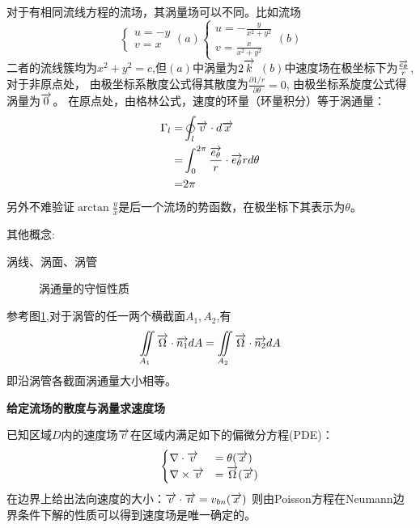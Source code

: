 对于有相同流线方程的流场，其涡量场可以不同。比如流场
\begin{equation}\label{eq:31example}
\begin{cases}u=-y\\v=x\end{cases}(a) \begin{cases}u=-\frac{y}{x^2+y^2}\\v=\frac{x}{x^2+y^2}\end{cases}(b)
\end{equation}
二者的流线簇均为$x^2+y^2=c$,但$(a)$中涡量为$2\overrightarrow{k}$
$(b)$中速度场在极坐标下为$\frac{\overrightarrow{e_{\theta}}}{r}$,对于非原点处，
由极坐标系散度公式\cite{CylindricalCoordinates}得其散度为$\frac{\partial 1/r}{\partial \theta}=0$,
由极坐标系旋度公式\cite{CurlFormular}得涡量为$\overrightarrow{0}$。
在原点处，由格林公式，速度的环量（环量积分）等于涡通量：
\begin{align}
\Gamma_l =& \oint_l \overrightarrow{v}\cdot d\overrightarrow{x}\\
=& \int_{0}^{2\pi} \frac{\overrightarrow{e_{\theta}}}{r}\cdot  \overrightarrow{e_{\theta}} rd\theta \\
=& 2\pi
\end{align}
另外不难验证$\arctan\frac{y}{x}$是后一个流场的势函数，在极坐标下其表示为$\theta$。

其他概念:

涡线、涡面、涡管

\begin{figure}[!ht]
\def\svgwidth{5cm}
\centering

\caption{涡通量的守恒性质}\label{fig:312}
\end{figure}



参考图\ref{fig:312},对于涡管的任一两个横截面$A_1,A_2$,有
\begin{equation}
\iint\limits_{A_1} \overrightarrow{\Omega}\cdot \overrightarrow{n_1} dA=\iint\limits_{A_2} \overrightarrow{\Omega}\cdot \overrightarrow{n_2} dA
\end{equation}
即沿涡管各截面涡通量大小相等。

\textbf{给定流场的散度与涡量求速度场}

已知区域$D$内的速度场$\overrightarrow{v}$在区域内满足如下的偏微分方程(PDE)：
\begin{equation}
\begin{cases}
\nabla \cdot \overrightarrow{v} &=\theta (\overrightarrow{x})\\
\nabla \times \overrightarrow{v} &=\overrightarrow{\Omega}(\overrightarrow{x})\\
\end{cases}
\end{equation}
在边界上给出法向速度的大小：$\overrightarrow{v}\cdot \overrightarrow{n} =v_{bn}(\overrightarrow{x})$
则由Poisson方程在Neumann边界条件下解的性质可以得到速度场是唯一确定的。


